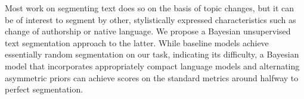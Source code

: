 Most work on segmenting text does so on the basis of topic changes, but it can be of interest to segment by other, stylistically expressed characteristics such as change of authorship or native language.  We propose a Bayesian unsupervised text segmentation approach to the latter.  While baseline models achieve essentially random segmentation on our task, indicating its difficulty, a Bayesian model that incorporates appropriately compact language models and alternating asymmetric priors can achieve scores on the standard metrics around halfway to perfect segmentation.
